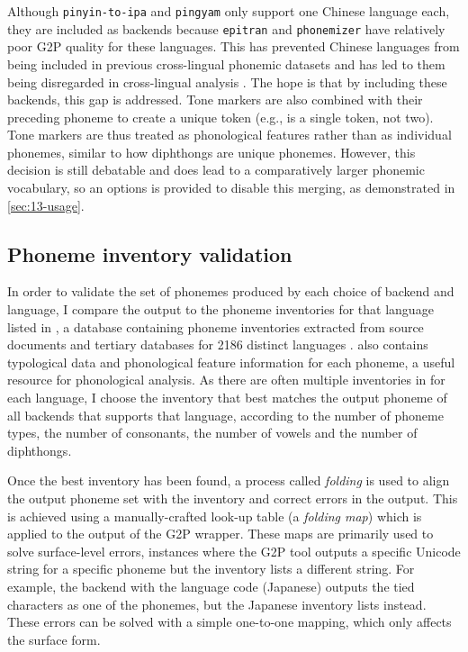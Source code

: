 Although \texttt{pinyin-to-ipa} and \texttt{pingyam} only support one Chinese language each, they are included as backends because \texttt{epitran} and \texttt{phonemizer} have relatively poor G2P quality for these languages. This has prevented Chinese languages from being included in previous cross-lingual phonemic datasets \citep{ahn-chodroff-2022-voxcommunis} and has led to them being disregarded in cross-lingual analysis \citep{pimentel2020phonotactic}. The hope is that by including these backends, this gap is addressed. Tone markers are also combined with their preceding phoneme to create a unique token (e.g.,  is a single token, not two). Tone markers are thus treated as phonological features rather than as individual phonemes, similar to how diphthongs are unique phonemes. However, this decision is still debatable and does lead to a comparatively larger phonemic vocabulary, so an options is provided to disable this merging, as demonstrated in \cref{sec:13-usage}. 

\subsection{Phoneme inventory validation}\label{sec:13-folding}

In order to validate the set of phonemes produced by each choice of backend and language, I compare the output to the phoneme inventories for that language listed in \phoible, a database containing phoneme inventories extracted from source documents and tertiary databases for 2186 distinct languages \citep{phoible}. \phoible also contains typological data and phonological feature information for each phoneme, a useful resource for phonological analysis. As there are often multiple inventories in \phoible for each language, I choose the inventory that best matches the output phoneme of all backends that supports that language, according to the number of phoneme types, the number of consonants, the number of vowels and the number of diphthongs.

Once the best inventory has been found, a process called \emph{folding} is used to align the output phoneme set with the inventory and correct errors in the output. This is achieved using a manually-crafted look-up table (a \emph{folding map}) which is applied to the output of the G2P wrapper. These maps are primarily used to solve surface-level errors, instances where the G2P tool outputs a specific Unicode string for a specific phoneme but the inventory lists a different string. For example, the  backend with the  language code (Japanese) outputs the tied characters  as one of the phonemes, but the Japanese inventory lists  instead. These errors can be solved with a simple one-to-one mapping, which only affects the surface form.

